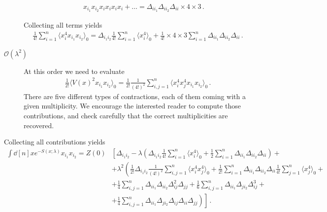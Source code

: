 \documentclass[notes.tex]{subfiles}
\begin{document}
\begin{description}
\begin{itemize}
\begin{align}
                  x_{i_1} x_{i_2}  x_{i} x_{i} x_{i} x_{i} + \ldots =
                  \Delta_{i i_1} \Delta_{i i_2} \Delta_{i i} \times 4
                  \times 3\, .
                \end{align}
        \end{itemize}
        Collecting all terms yields
        \begin{align}
          \frac{1}{4!} \sum_{i=1}^n
          \langle x_i^4 x_{i_1} x_{i_2} \rangle_0 =
          \Delta_{i_1 i_2} \frac{1}{4!} \sum_{i=1}^n \langle x_i^4\rangle_0
          + \frac{1}{4!} \times 4 \times 3 \sum_{i=1}^n \Delta_{i i_1}
          \Delta_{i i_2} \Delta_{i i} \, .
        \end{align}
  \item[$\mathcal{O}(\lambda^2)$] At this order we need to evaluate
        \begin{align}
          \frac{1}{2!} \langle V(x)^2 x_{i_1} x_{i_2} \rangle_0 =
          \frac{1}{2!} \frac{1}{(4!)^2} \sum_{i,j=1}^n \langle x_i^4 x_j^4
          x_{i_1} x_{i_2} \rangle_0\, .
        \end{align}
        There are five different types of contractions, each of them coming
        with a given multiplicity. We encourage the interested reader to
        compute those contributions, and check carefully that the correct
        multiplicities are recovered.
\end{description}
Collecting all contributions yields
\begin{align}
  \int \dd[n]{x} e^{-S(x;\lambda)}
  x_{i_1} x_{i_2} = Z(0) &
  \left[
    \Delta_{i_1 i_2} - \lambda \left(\Delta_{i_1 i_2}
    \frac{1}{4!} \sum_{i=1}^n \langle
    x_i^4\rangle_0 +  \frac12 \sum_{i=1}^n
    \Delta_{i i_1} \Delta_{i i_2} \Delta_{i i}
    \right) + \right. \nonumber            \\
                         & \left.
    + \lambda^2 \left(
    \frac{1}{2!} \Delta_{i_1 i_2} \frac{1}{(4!)^2}
    \sum_{i,j=1}^n \langle x_i^4 x_j^4 \rangle_0
    + \frac{1}{2!} \sum_{i=1}^n \Delta_{i i_1}
    \Delta_{i i_2} \Delta_{i i}  \frac{1}{4!}
    \sum_{j=1}^n \langle x_j^4 \rangle_0
    + \right. \right. \nonumber            \\
                         & + \left. \left.
    \frac{1}{4} \sum_{i,j=1}^n \Delta_{i i_1}
    \Delta_{i i_2} \Delta_{i j}^2 \Delta_{jj}
    + \frac{1}{6} \sum_{i,j=1}^n \Delta_{i i_1}
    \Delta_{j i_2} \Delta_{i j}^3 +
    \right. \right. \nonumber              \\
    \label{eq:TwoPointNotNorm}
                         & + \left. \left.
    \frac{1}{4} \sum_{i,j=1}^n \Delta_{i i_1}
    \Delta_{j i_2} \Delta_{i j} \Delta_{ii}\Delta_{jj}
    \right)
    \right]\, .
\end{align}
\end{document}
